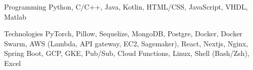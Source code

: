 

\begin{cvskills}

  \cvskill
    {Programming} %
    {Python, C/C++, Java, Kotlin, HTML/CSS, JavaScript, VHDL, Matlab} %

  \cvskill
    {Technologies} %
    {PyTorch, Pillow, Sequelize, MongoDB, Postgre, Docker, Docker Swarm, AWS (Lambda, API gateway, EC2, Sagemaker), React, Nextjs, Nginx, Spring Boot, GCP, GKE, Pub/Sub, Cloud Functions, Linux, Shell (Bash/Zsh), Excel}





\end{cvskills}



